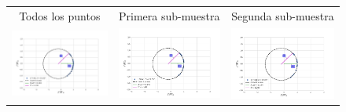 \begin{figure}
  \centering
\begin{tabular}{@{}c@{}c@{}c@{}}
 
Todos los puntos & Primera sub-muestra & Segunda sub-muestra \\ \includegraphics[clip]{./Programs/LV-bowshocks-xyfancy-positionswill-177-341} & \includegraphics[clip]{./Programs/Multi-Fit/samp00/LV-bowshocks-xyfancy-positionssamp00-177-341} &
\includegraphics[clip]{./Programs/Multi-Fit/samp01/LV-bowshocks-xyfancy-positionssamp01-177-341} \\

\end{tabular}
\end{figure}
